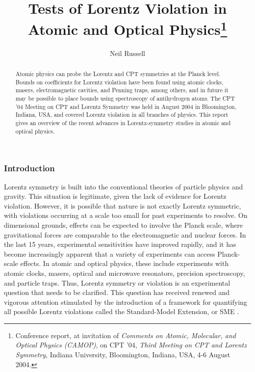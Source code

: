 \documentclass[twocolumn]{revtex4}
\begin{document}
\title{Tests of Lorentz Violation in Atomic and Optical
Physics\footnote{Conference report, at invitation of {\it Comments
on Atomic, Molecular, and Optical Physics (CAMOP)}, on CPT '04, {\it
Third Meeting on CPT and Lorentz Symmetry}, Indiana University,
Bloomington, Indiana, USA, 4-6 August 2004.}}
\author{Neil Russell}

\begin{abstract}
Atomic physics can probe the Lorentz and CPT symmetries at
the Planck level.
Bounds on coefficients for Lorentz violation have been found using
atomic clocks,
masers,
electromagnetic cavities,
and Penning traps,
among others,
and in future
it may be possible to place bounds
using spectroscopy of antihydrogen atoms.
The CPT '04 Meeting on CPT and Lorentz Symmetry
was held in August 2004 in Bloomington, Indiana, USA,
and covered Lorentz violation in all branches of physics.
This report gives an overview of the recent advances
in Lorentz-symmetry studies in atomic and optical physics.
\end{abstract}

\maketitle

\subsubsection{Introduction}
Lorentz symmetry is built into the
conventional theories of
particle physics and gravity.
This situation is legitimate,
given the lack of evidence for Lorentz violation.
However, it is possible that nature
is not exactly Lorentz symmetric,
with violations occurring
at a scale too small for past experiments to resolve.
On dimensional grounds,
effects can be expected to involve
the Planck scale,
where gravitational forces are comparable to the
electromagnetic and nuclear forces.
In the last 15 years,
experimental sensitivities have improved rapidly,
and it has become increasingly apparent
that a variety of experiments can access
Planck-scale effects.
In atomic and optical physics,
these include experiments with
atomic clocks,
masers,
optical and microwave resonators,
precision spectroscopy,
and particle traps.
Thus,
Lorentz symmetry or violation
is an experimental question
that needs to be clarified.
This question has received renewed and vigorous attention
stimulated by the introduction of
a framework for quantifying all possible Lorentz violations
called the Standard-Model Extension, or SME \cite{ck,grav}.
\end{document}
